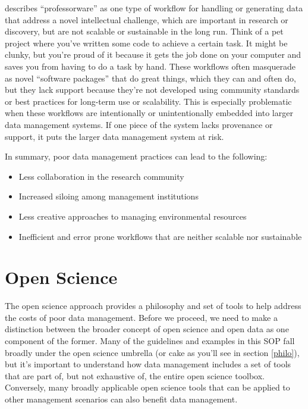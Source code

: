 \documentclass[
]{book}
\providecommand{\tightlist}{%
  \setlength{\itemsep}{0pt}\setlength{\parskip}{0pt}}
\begin{document}
\citet{Mons18} describes ``professorware'' as one type of workflow for handling or generating data that address a novel intellectual challenge, which are important in research or discovery, but are not scalable or sustainable in the long run. Think of a pet project where you've written some code to achieve a certain task. It might be clunky, but you're proud of it because it gets the job done on your computer and saves you from having to do a task by hand. These workflows often masquerade as novel ``software packages'' that do great things, which they can and often do, but they lack support because they're not developed using community standards or best practices for long-term use or scalability. This is especially problematic when these workflows are intentionally or unintentionally embedded into larger data management systems. If one piece of the system lacks provenance or support, it puts the larger data management system at risk.

In summary, poor data management practices can lead to the following:

\begin{itemize}
\tightlist
\item
  Less collaboration in the research community
\item
  Increased siloing among management institutions
\item
  Less creative approaches to managing environmental resources
\item
  Inefficient and error prone workflows that are neither scalable nor sustainable
\end{itemize}

\hypertarget{opengeneral}{%
\section{Open Science}\label{opengeneral}}

The open science approach provides a philosophy and set of tools to help address the costs of poor data management. Before we proceed, we need to make a distinction between the broader concept of open science and open data as one component of the former. Many of the guidelines and examples in this SOP fall broadly under the open science umbrella (or cake as you'll see in section \ref{philo}), but it's important to understand how data management includes a set of tools that are part of, but not exhaustive of, the entire open science toolbox. Conversely, many broadly applicable open science tools that can be applied to other management scenarios can also benefit data management.
\end{document}
